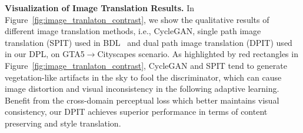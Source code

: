\documentclass[10pt,twocolumn,letterpaper]{article}
\begin{document}
{\noindent \textbf{Visualization of Image Translation Results.}}\hspace{3pt}
In Figure~\ref{fig:image_tranlaton_contrast}, we show the qualitative results of different image translation methods, i.e., CycleGAN, single path image translation (SPIT) used in BDL~\cite{li2019bidirectional} and dual path image translation (DPIT) used in our DPL, on GTA5$\rightarrow$Cityscapes scenario. As highlighted by red rectangles in Figure~\ref{fig:image_tranlaton_contrast}, CycleGAN and SPIT tend to generate vegetation-like artifacts in the sky to fool the discriminator, which can cause image distortion and visual inconsistency in the following adaptive learning. Benefit from the cross-domain perceptual loss which better maintains visual consistency, our DPIT achieves superior performance in terms of content preserving and style translation.
\end{document}
